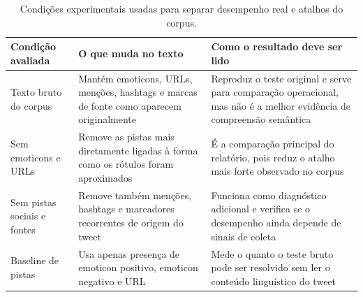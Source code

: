 \documentclass[11pt,a4paper]{article}
\newcommand{\altrowcolors}{\rowcolors{2}{black!4}{white}}
\newcommand{\clearrowcolors}{\rowcolors{2}{}{}}
\begin{document}
\begin{table}[h]
\small
\centering
\altrowcolors
\begin{tabularx}{\linewidth}{@{}L{3.1cm}Y Y@{}}
\toprule
\textbf{Condição avaliada} & \textbf{O que muda no texto} & \textbf{Como o resultado deve ser lido} \\
\midrule
Texto bruto do corpus & Mantém emoticons, URLs, menções, hashtags e marcas de fonte como aparecem originalmente & Reproduz o teste original e serve para comparação operacional, mas não é a melhor evidência de compreensão semântica \\
Sem emoticons e URLs & Remove as pistas mais diretamente ligadas à forma como os rótulos foram aproximados & É a comparação principal do relatório, pois reduz o atalho mais forte observado no corpus \\
Sem pistas sociais e fontes & Remove também menções, hashtags e marcadores recorrentes de origem do tweet & Funciona como diagnóstico adicional e verifica se o desempenho ainda depende de sinais de coleta \\
Baseline de pistas & Usa apenas presença de emoticon positivo, emoticon negativo e URL & Mede o quanto o teste bruto pode ser resolvido sem ler o conteúdo linguístico do tweet \\
\bottomrule
\end{tabularx}
\clearrowcolors
\caption{Condições experimentais usadas para separar desempenho real e atalhos do corpus.}
\label{tab:condicoes}
\end{table}
\end{document}
